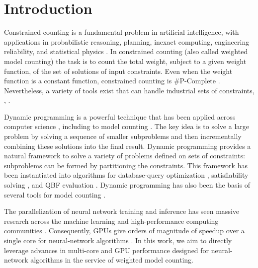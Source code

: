 \chapter{Introduction}
\label{ch:intro}
Constrained counting is a fundamental problem in artificial intelligence, with applications in probabilistic reasoning, planning, inexact computing, engineering reliability, and statistical physics \cite{Bacchus2003,DH07,GSS08,naveh2007constraint}. In constrained counting (also called weighted model counting) the task is to count the total weight, subject to a given weight function, of the set of solutions of input constraints. Even when the weight function is a constant function, constrained counting is \#P-Complete \cite{Valiant79}. Nevertheless, a variety of tools exist that can handle industrial sets of constraints, \eg, \cite{sang2004combining,OD15,darwiche2004new,LM17}. 


Dynamic programming is a powerful technique that has been applied across computer science \cite{bellman1966dynamic}, including to model counting \cite{BDP09,SS10,jegou2016improving}.
The key idea is to solve a large problem by solving a sequence of smaller subproblems and then incrementally combining these solutions into the final result.
Dynamic programming provides a natural framework to solve a variety of problems defined on sets of constraints: subproblems can be formed by partitioning the constraints.
This framework has been instantiated into algorithms for database-query optimization \cite{MPPV04}, satisfiability solving \cite{uribe1994ordered,aguirre2001random,pan2005symbolic}, and QBF evaluation \cite{charwat2016bdd}. 
Dynamic programming has also been the basis of several tools for model counting \cite{DPV20,fichte2020exploiting}.


The parallelization of neural network training and inference has seen massive research across the machine learning and high-performance computing communities \cite{ABCCDDDGII16,JYPPABBBBB17,PGMLJGKLGA19}. Consequently, GPUs give orders of magnitude of speedup over a single core for neural-network algorithms \cite{KSTKPPRS19,NRBHHJN15}. In this work, we aim to directly leverage advances in multi-core and GPU performance designed for neural-network algorithms in the service of weighted model counting.


